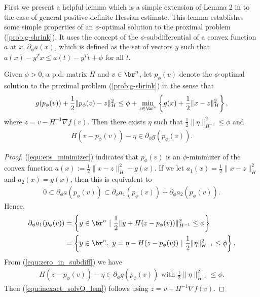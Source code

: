 \documentclass[11pt]{article}
\numberwithin{equation}{section}
\begin{document}
First we present a helpful lemma which is a simple extension of Lemma 2 in \cite{Schmidtetal} to the case of general positive definite Hessian estimate. This lemma establishes some simple properties of an $\phi$-optimal solution to the proximal problem (\ref{prob:g-shrink}).  It uses the concept of the $\phi$-subdifferential of a convex function $a$ at $x$, 
$\partial_{\phi} a(x)$, which is defined as the set of vectors $y$ such that $a(x) - y^Tx \leq a(t) - y^Tt + \phi$ for all $t$. 
\begin{lemma}
    \label{lem:inexact_1st_opt_cond}
    Given $\phi >0$, a p.d. matrix $H$ and $v\in \br^n$, let $p_{\phi}(v)$ denote the $\phi$-optimal solution to the proximal problem (\ref{prob:g-shrink}) in the sense that
    \begin{align}
        \label{equ:eps_minimizer}
        g(p_{\phi}(v))+\frac{1}{2}\|p_{\phi}(v)-z\|_H^2 \leq \phi +
        \min_{x\in\br^n}\left\{g(x)+\frac{1}{2}\|x-z\|_H^2 \right\},
    \end{align}
    where $z = v - H^{-1} \nabla f(v)$. Then there exists $\eta$ such that $\frac{1}{2} \| \eta \|^2_{H^{-1}} \leq \phi$ and
    \begin{align}
        \label{equ:inexact_solvQ_lem}
        H(v-p_{\phi}(v))  - \eta \in \partial_{\phi}g(p_{\phi}(v)).
    \end{align}
\end{lemma}


\begin{proof}
    (\ref{equ:eps_minimizer}) indicates that $p_{\phi}(v)$ is an $\phi$-minimizer of the convex function $a(x) := \frac{1}{2}\|x-z\|_H^2+g(x)$. If we let $a_1(x) = \frac{1}{2}\|x-z\|_H^2$ and $a_2(x) = g(x)$, then this is equivalent to
    \begin{align}
        \label{equ:zero_in_subdiff}
        0 \subset \partial_{\phi} a(p_{\phi}(v)) \subset \partial_{\phi} a_1(p_{\phi}(v)) + \partial_{\phi} a_2(p_{\phi}(v)).
    \end{align}
    Hence,
    \begin{align*}
        \partial_{\phi} a_1(p_{\phi}(v)) &= \left\{ y \in \br^n ~|~ \frac{1}{2} \| y + H(z-p_{\phi}(v)) \|^2_{H^{-1}} \leq \phi \right\} \\
        &= \left\{ y \in \br^n, ~y = \eta - H(z-p_{\phi}(v)) ~|~ \frac{1}{2} \|\eta\|^2_{H^{-1}} \leq \phi \right\}.
    \end{align*}
    From (\ref{equ:zero_in_subdiff}) we have
    \begin{align}
        H(z-p_{\phi}(v)) - \eta \in \partial_{\phi}g(p_{\phi}(v)) \mbox{ with } \frac{1}{2} \|\eta\|^2_{H^{-1}} \leq \phi.
    \end{align}
    Then (\ref{equ:inexact_solvQ_lem}) follows using $z = v - H^{-1} \nabla f(v)$.
\end{proof}
\end{document}
